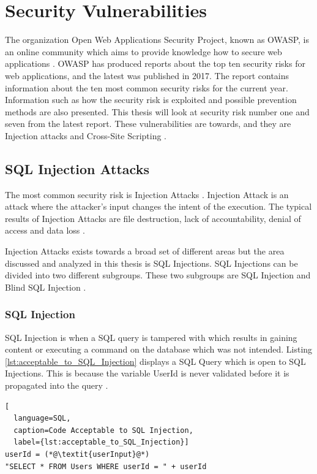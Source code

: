 \section{Security Vulnerabilities}
\label{SecurityVulnerabilities}
The organization Open Web Applications Security Project, known as OWASP, is an online community which aims to provide knowledge how to secure web applications \parencite{OpenWebApplicationSecurityProject}. OWASP has produced reports about the top ten security risks for web applications, and the latest was published in 2017. The report contains information about the ten most common security risks for the current year. Information such as how the security risk is exploited and possible prevention methods are also presented. This thesis will look at security risk number one and seven from the latest report. These vulnerabilities are towards, and they are Injection attacks and Cross-Site Scripting \parencite{OWASP2017}.



\subsection{SQL Injection Attacks}
The most common security risk is Injection Attacks \parencite{OWASP2017}. Injection Attack is an attack where the attacker's input changes the intent of the execution. The typical results of Injection Attacks are file destruction, lack of accountability, denial of access and data loss \parencite{Secure_Web}.

Injection Attacks exists towards a broad set of different areas but the area discussed and analyzed in this thesis is SQL Injections. SQL Injections can be divided into two different subgroups. These two subgroups are SQL Injection and Blind SQL Injection \parencite{Secure_Web}.



\subsubsection{SQL Injection}
SQL Injection is when a SQL query is tampered with which results in gaining content or executing a command on the database which was not intended. Listing \ref{lst:acceptable_to_SQL_Injection} displays a SQL Query which is open to SQL Injections. This is because the variable UserId is never validated before it is propagated into the query \parencite{JustinClarke-Salt2009SIAa, Secure_Web}.

\hfill
\begin{lstlisting}[
  language=SQL,
  caption=Code Acceptable to SQL Injection,
  label={lst:acceptable_to_SQL_Injection}]
userId = (*@\textit{userInput}@*)
"SELECT * FROM Users WHERE userId = " + userId
\end{lstlisting}
\hfill

